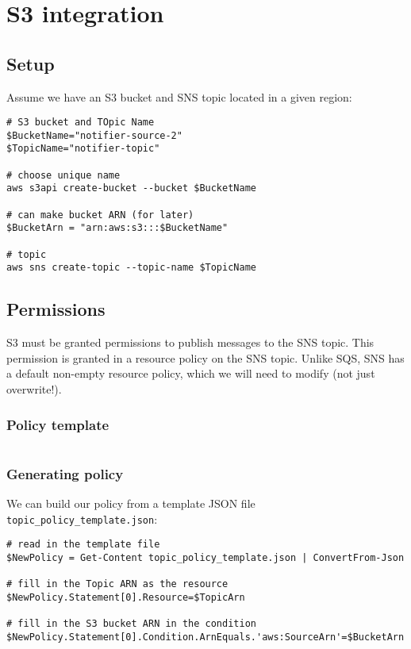 \chapter{S3 integration}
\label{ch:s3-integration}

\section{Setup}\label{setup-1}

Assume we have an S3 bucket and SNS topic located in a given region:

\begin{verbatim}
# S3 bucket and TOpic Name
$BucketName="notifier-source-2"
$TopicName="notifier-topic"

# choose unique name
aws s3api create-bucket --bucket $BucketName

# can make bucket ARN (for later)
$BucketArn = "arn:aws:s3:::$BucketName"

# topic
aws sns create-topic --topic-name $TopicName

\end{verbatim}


\section{Permissions}\label{permissions}

S3 must be granted permissions to publish messages to the SNS topic.
This permission is granted in a resource policy on the SNS topic.
Unlike SQS, SNS has a default non-empty resource policy, which we will need to modify (not just overwrite!).

\subsection{Policy template}

\inputminted{json}{topic_policy_template.json}

\subsection{Generating policy}\label{generating-policy}

We can build our policy from a template JSON file
\texttt{topic\_policy\_template.json}:

\begin{verbatim}
# read in the template file
$NewPolicy = Get-Content topic_policy_template.json | ConvertFrom-Json

# fill in the Topic ARN as the resource
$NewPolicy.Statement[0].Resource=$TopicArn

# fill in the S3 bucket ARN in the condition
$NewPolicy.Statement[0].Condition.ArnEquals.'aws:SourceArn'=$BucketArn
\end{verbatim}

